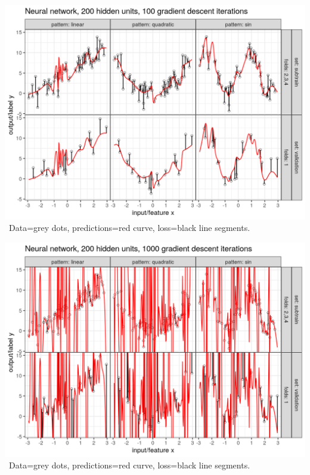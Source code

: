 \begin{frame}
  \includegraphics[width=\textwidth]{figure-overfitting-pred-units=200-maxit=100.png}
\ Data=grey dots, predictions=red curve, loss=black line segments.

\end{frame}


\begin{frame}
  \includegraphics[width=\textwidth]{figure-overfitting-pred-units=200-maxit=1000.png}
\ Data=grey dots, predictions=red curve, loss=black line segments.

\end{frame}


